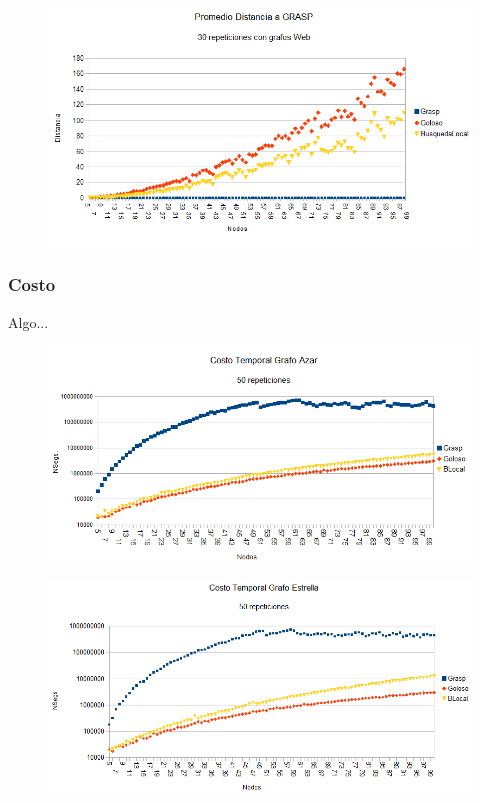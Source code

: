 \begin{figure}[H]
	\centering
	\includegraphics[scale=0.6]{distancia-Grasp-Web.png}
\end{figure}

\subsubsection{Costo}

\quad Algo...

\begin{figure}[H]
	\centering
	\includegraphics[scale=0.6]{timingAzar.png}
\end{figure}

\begin{figure}[H]
	\centering
	\includegraphics[scale=0.6]{timingStar.png}
\end{figure}

